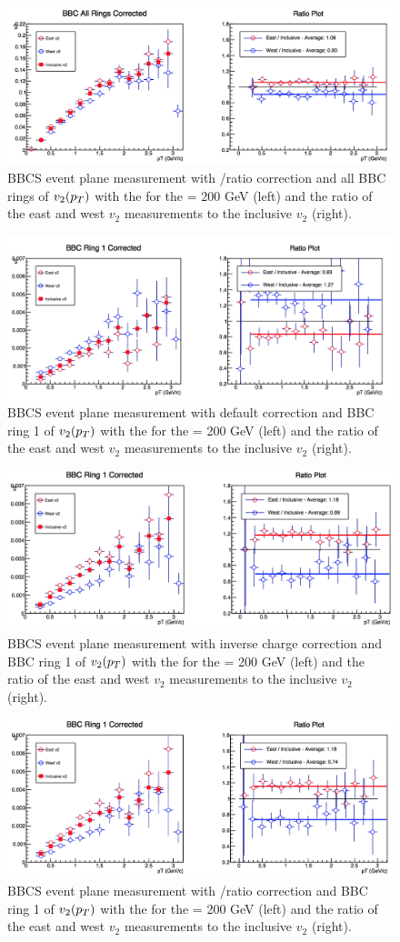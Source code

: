\begin{figure}
\includegraphics[width=0.65\linewidth]{figs/bbc_all_pp.png}
\caption{BBCS event plane measurement with \pp/\pau ratio correction and all BBC rings of $v_{2}(\mbox{$p_T$})$ with the  for the \pau \sqsn = 200 GeV (left) and the ratio of the east and west $v_2$ measurements to the inclusive $v_2$ (right).}
\end{figure}

\begin{figure}
\includegraphics[width=0.65\linewidth]{figs/bbc_1_default.png}
\caption{BBCS event plane measurement with default correction and BBC ring 1 of $v_{2}(\mbox{$p_T$})$ with the  for the \pau \sqsn = 200 GeV (left) and the ratio of the east and west $v_2$ measurements to the inclusive $v_2$ (right).}
\end{figure}

\begin{figure}
\includegraphics[width=0.65\linewidth]{figs/bbc_1_data.png}
\caption{BBCS event plane measurement with inverse charge correction and BBC ring 1 of $v_{2}(\mbox{$p_T$})$ with the  for the \pau \sqsn = 200 GeV (left) and the ratio of the east and west $v_2$ measurements to the inclusive $v_2$ (right).}
\end{figure}
\clearpage
\begin{figure}
\includegraphics[width=0.65\linewidth]{figs/bbc_1_pp.png}
\caption{BBCS event plane measurement with \pp/\pau ratio correction and BBC ring 1 of $v_{2}(\mbox{$p_T$})$ with the  for the \pau \sqsn = 200 GeV (left) and the ratio of the east and west $v_2$ measurements to the inclusive $v_2$ (right).}
\end{figure}

